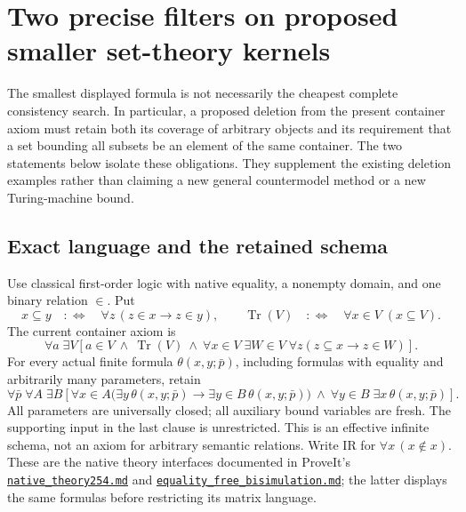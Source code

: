 \section{Two precise filters on proposed smaller set-theory kernels}
\label{sec:theory-filters}

The smallest displayed formula is not necessarily the cheapest complete
consistency search.  In particular, a proposed deletion from the present
container axiom must retain both its coverage of arbitrary objects and its
requirement that a set bounding all subsets be an element of the same
container.  The two statements below isolate these obligations.  They
supplement the existing deletion examples rather than claiming a new general
countermodel method or a new Turing-machine bound.

\subsection{Exact language and the retained schema}

Use classical first-order logic with native equality, a nonempty domain, and
one binary relation $\in$.  Put
\[
 x\subseteq y\quad:\!\Longleftrightarrow\quad
       \forall z\,(z\in x\longrightarrow z\in y),
 \qquad
 \operatorname{Tr}(V)\quad:\!\Longleftrightarrow\quad
       \forall x\in V\;(x\subseteq V).
\]
The current container axiom is
\begin{equation}
\forall a\;\exists V\left[
 a\in V\ \land\ \operatorname{Tr}(V)\ \land\
 \forall x\in V\;\exists W\in V\;\forall z
       (z\subseteq x\longrightarrow z\in W)\right].
\tag{CP}\label{eq:filter-cp}
\end{equation}
For every actual finite formula $\theta(x,y;\bar p)$, including formulas
with equality and arbitrarily many parameters, retain
\begin{equation}
\forall\bar p\;\forall A\;\exists B\left[
 \forall x\in A\bigl(\exists y\,\theta(x,y;\bar p)
             \longrightarrow\exists y\in B\,\theta(x,y;\bar p)\bigr)
 \ \land\ \forall y\in B\;\exists x\,\theta(x,y;\bar p)
 \right].
\tag{GIC}\label{eq:filter-gic}
\end{equation}
All parameters are universally closed; all auxiliary bound variables are
fresh.  The supporting input in the last clause is unrestricted.  This is
an effective infinite schema, not an axiom for arbitrary semantic relations.
Write $\mathrm{IR}$ for $\forall x\,(x\notin x)$.  These are the native
theory interfaces documented in ProveIt's
\href{https://github.com/VladimirReshetnikov/ProveIt/blob/13ec39ed43148b1807f51ed6e6528e1c84659562/Computability/BusyBeaver/Research/ZFC/native_theory254.md}{\texttt{native\_theory254.md}}
and
\href{https://github.com/VladimirReshetnikov/ProveIt/blob/13ec39ed43148b1807f51ed6e6528e1c84659562/Computability/BusyBeaver/Research/ZFC/equality_free_bisimulation.md}{\texttt{equality\_free\_bisimulation.md}};
the latter displays the same formulas before restricting its matrix language.

